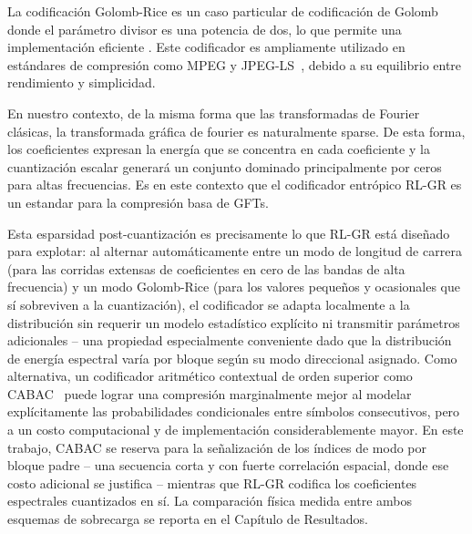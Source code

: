 La codificación Golomb-Rice es un caso particular de codificación de Golomb donde el
parámetro divisor es una potencia de dos, lo que permite una implementación eficiente
\cite{malvar2006adaptive}. Este codificador es ampliamente utilizado en estándares de
compresión como MPEG y JPEG-LS~\cite{weinberger2000locoi}, debido a su equilibrio entre rendimiento
y simplicidad.

En nuestro contexto, de la misma forma que las transformadas de Fourier clásicas, la transformada gráfica de fourier es naturalmente sparse. De esta forma, los coeficientes expresan la energía que se concentra en cada coeficiente y la cuantización escalar generará un conjunto dominado principalmente por ceros para altas frecuencias. Es en este contexto que el codificador entrópico RL-GR es un estandar para la compresión basa de GFTs.


Esta esparsidad post-cuantización es precisamente lo que RL-GR está diseñado para explotar:
al alternar automáticamente entre un modo de longitud de carrera (para las corridas
extensas de coeficientes en cero de las bandas de alta frecuencia) y un modo Golomb-Rice
(para los valores pequeños y ocasionales que sí sobreviven a la cuantización), el
codificador se adapta localmente a la distribución sin requerir un modelo estadístico
explícito ni transmitir parámetros adicionales -- una propiedad especialmente conveniente
dado que la distribución de energía espectral varía por bloque según su modo direccional
asignado. Como alternativa, un codificador aritmético contextual de orden superior como
CABAC~\cite{marpe2003cabac} puede lograr una compresión marginalmente mejor al modelar explícitamente las
probabilidades condicionales entre símbolos consecutivos, pero a un costo computacional y
de implementación considerablemente mayor. En este trabajo, CABAC se reserva para la
señalización de los índices de modo por bloque padre -- una secuencia corta y con fuerte
correlación espacial, donde ese costo adicional se justifica -- mientras que RL-GR
codifica los coeficientes espectrales cuantizados en sí. La comparación física medida
entre ambos esquemas de sobrecarga se reporta en el Capítulo de Resultados.


